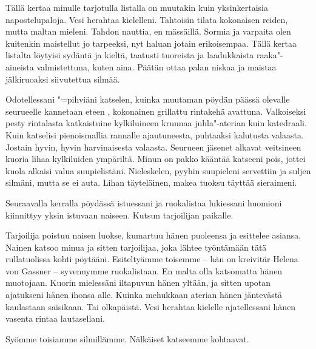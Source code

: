 \indent{}T\"{a}ll\"{a} kertaa minulle tarjotulla listalla on muutakin kuin yksinkertaisia napostelupaloja. Vesi herahtaa kielelleni. Tahtoisin tilata kokonaisen reiden, mutta maltan mieleni. Tahdon nauttia, en m\"{a}ss\"{a}ill\"{a}. Sormia ja varpaita olen kuitenkin maistellut jo tarpeeksi, nyt haluan jotain erikoisempaa. T\"{a}ll\"{a} kertaa listalta l\"{o}ytyisi syd\"{a}nt\"{a} ja kielt\"{a}, taatusti tuoreista ja laadukkaista raaka"-aineista valmistettuna, kuten aina. P\"{a}\"{a}t\"{a}n ottaa palan niskaa ja maistaa j\"{a}lkiruoaksi siivutettua silm\"{a}\"{a}.

\indent{}Odotellessani "=pihvi\"{a}ni katselen, kuinka muutaman p\"{o}yd\"{a}n p\"{a}\"{a}ss\"{a} olevalle seurueelle kannetaan eteen , kokonainen grillattu rintakeh\"{a} avattuna. Valkoiseksi pesty rintalasta katkaistuine kylkiluineen kruunaa juhla"-aterian kuin katedraali. Kuin katselisi pienoismallia rannalle ajautuneesta, puhtaaksi kalutusta valaasta. Jostain hyvin, hyvin harvinaisesta valaasta. Seurueen j\"{a}senet alkavat veitsineen kuoria lihaa kylkiluiden ymp\"{a}rilt\"{a}. Minun on pakko k\"{a}\"{a}nt\"{a}\"{a} katseeni pois, jottei kuola alkaisi valua suupielist\"{a}ni. Nieleskelen, pyyhin suupieleni servettiin ja suljen silm\"{a}ni, mutta se ei auta. Lihan t\"{a}ytel\"{a}inen, makea tuoksu t\"{a}ytt\"{a}\"{a} sieraimeni.



\subchapter{}\noindent{}Seuraavalla kerralla p\"{o}yd\"{a}ss\"{a} istuessani ja ruokalistaa lukiessani huomioni kiinnittyy yksin istuvaan naiseen. Kutsun tarjoilijan paikalle.

\indent{}

\indent{}Tarjoilija poistuu naisen luokse, kumartuu h\"{a}nen puoleensa ja esittelee asiansa. Nainen katsoo minua ja sitten tarjoilijaa, joka l\"{a}htee ty\"{o}nt\"{a}m\"{a}\"{a}n t\"{a}t\"{a} rullatuolissa kohti p\"{o}yt\"{a}\"{a}ni. Esitelty\"{a}mme toisemme -- h\"{a}n on kreivit\"{a}r Helena von Gassner -- syvennymme ruokalistaan. En malta olla katsomatta h\"{a}nen muotojaan. Kuorin mieless\"{a}ni iltapuvun h\"{a}nen ylt\"{a}\"{a}n, ja sitten upotan ajatukseni h\"{a}nen ihonsa alle. Kuinka mehukkaan aterian h\"{a}nen j\"{a}ntev\"{a}st\"{a} kaulastaan saisikaan. Tai olkap\"{a}ist\"{a}. Vesi herahtaa kielelle ajatellessani h\"{a}nen vasenta rintaa lautasellani.

\indent{}Sy\"{o}mme toisiamme silmill\"{a}mme. N\"{a}lk\"{a}iset katseemme kohtaavat.

